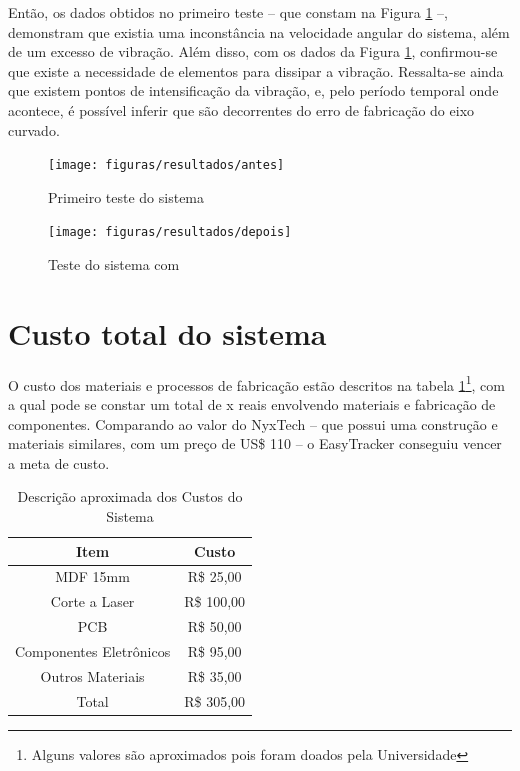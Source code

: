 Então, os dados obtidos no primeiro teste -- que constam na Figura \ref{} --, demonstram que existia uma inconstância na velocidade angular do sistema, além de um excesso de vibração. Além disso, com os dados da Figura \ref{}, confirmou-se que existe a necessidade de elementos para dissipar a vibração. Ressalta-se ainda que existem pontos de intensificação da vibração, e, pelo período temporal onde acontece, é possível inferir que são decorrentes do erro de fabricação do eixo curvado. 

\begin{figure}[!htb]
	\centering
	\caption{Primeiro teste do sistema}
	\texttt{[image: figuras/resultados/antes]}
	\label{fig:antes}
\end{figure}

\begin{figure}[!htb]
	\centering
	\caption{Teste do sistema com}
	\texttt{[image: figuras/resultados/depois]}
	\label{fig:depois}
\end{figure}

\section{Custo total do sistema}
O custo dos materiais e processos de fabricação estão descritos na tabela \ref{table:custo}\footnote{Alguns valores são aproximados pois foram doados pela Universidade}, com a qual pode se constar um total de x reais envolvendo materiais e fabricação de componentes. Comparando ao valor do NyxTech -- que possui uma construção e materiais similares, com um preço de US\$ 110 -- o EasyTracker conseguiu vencer a meta de custo.  

\begin{table}[!htb]
	\centering
	\caption{Descrição aproximada dos Custos do Sistema}
	\begin{tabular}{c|c}
	Item	&	Custo	\\\hline\hline
	MDF	15mm	&	R\$ 25,00		\\\hline
	Corte a Laser			&	R\$ 100,00		\\\hline
	PCB			&	R\$ 50,00		\\\hline
	Componentes Eletrônicos			&	R\$ 95,00		\\\hline
	Outros Materiais		&	R\$ 35,00		\\\hline\hline
	Total			&	R\$ 305,00		\\
	\end{tabular}
	\label{table:custo}
\end{table}


